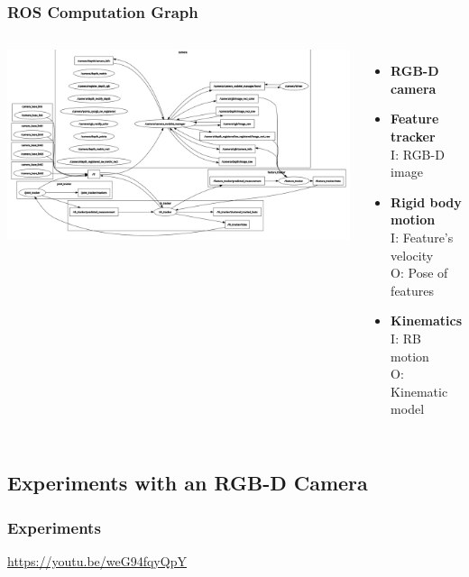 \documentclass{beamer}
\begin{document}
\begin{frame}
\frametitle{ROS Computation Graph}
\begin{columns}[c]
\includegraphics[scale=0.25]{rqt_graph.png}

\begin{itemize}
\item \textbf{RGB-D camera}
\item \textbf{Feature tracker}\\
I: RGB-D image
\item \textbf{Rigid body motion}\\
I: Feature's velocity\\
O: Pose of features
\item \textbf{Kinematics}\\
I: RB motion\\
O: Kinematic model
\end{itemize}
\end{columns}
\end{frame}

\subsection{Experiments with an RGB-D Camera}
\begin{frame}
\frametitle{Experiments}
\begin{center}
\url{https://youtu.be/weG94fqyQpY}
\end{center}
\end{frame}
\end{document}
